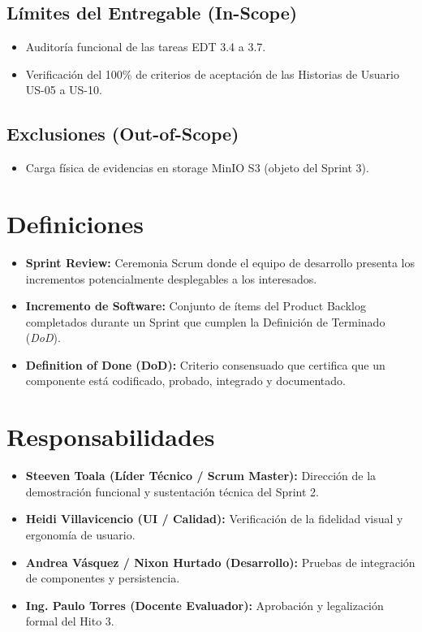 \documentclass[12pt,a4paper]{article}
\begin{document}
\subsection{Límites del Entregable (In-Scope)}
\begin{itemize}[leftmargin=1.5em, itemsep=2pt]
    \item Auditoría funcional de las tareas EDT 3.4 a 3.7.
    \item Verificación del 100\% de criterios de aceptación de las Historias de Usuario US-05 a US-10.
\end{itemize}
\subsection{Exclusiones (Out-of-Scope)}
\begin{itemize}[leftmargin=1.5em, itemsep=2pt]
    \item Carga física de evidencias en storage MinIO S3 (objeto del Sprint 3).
\end{itemize}

\section{Definiciones}
\begin{itemize}[leftmargin=1.5em, itemsep=2pt]
    \item \textbf{Sprint Review:} Ceremonia Scrum donde el equipo de desarrollo presenta los incrementos potencialmente desplegables a los interesados.
    \item \textbf{Incremento de Software:} Conjunto de ítems del Product Backlog completados durante un Sprint que cumplen la Definición de Terminado (\textit{DoD}).
    \item \textbf{Definition of Done (DoD):} Criterio consensuado que certifica que un componente está codificado, probado, integrado y documentado.
\end{itemize}

\section{Responsabilidades}
\begin{itemize}[leftmargin=1.5em, itemsep=2pt]
    \item \textbf{Steeven Toala (Líder Técnico / Scrum Master):} Dirección de la demostración funcional y sustentación técnica del Sprint 2.
    \item \textbf{Heidi Villavicencio (UI / Calidad):} Verificación de la fidelidad visual y ergonomía de usuario.
    \item \textbf{Andrea Vásquez / Nixon Hurtado (Desarrollo):} Pruebas de integración de componentes y persistencia.
    \item \textbf{Ing. Paulo Torres (Docente Evaluador):} Aprobación y legalización formal del Hito 3.
\end{itemize}
\end{document}
